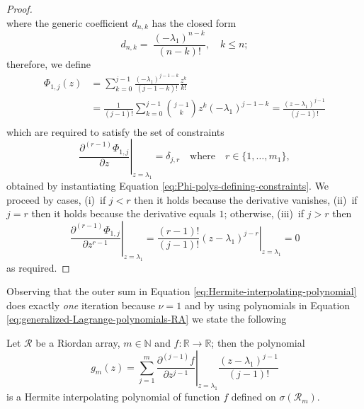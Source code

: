 \begin{proof}
\begin{equation}
\end{equation}
where the generic coefficient $d_{n,k}$ has the closed form
$$ d_{n,k} =~\frac{\left(-\lambda_{1}\right)^{n-k}}{\left(n-k\right)!},\quad k\leq n;$$ 
therefore, we define
\begin{displaymath}
\begin{split}
  \Phi_{1,j}(z) &= \sum_{k=0}^{j-1}{\frac{(-\lambda_{1})^{j-1-k}}{(j-1-k)!}\frac{z^{k}}{k!}}\\
                &= \frac{1}{(j-1)!}\sum_{k=0}^{j-1}{{ {j-1}\choose{k} }{z^{k}}{(-\lambda_{1})^{j-1-k}}}
                 = \frac{\left(z-\lambda_{1}\right)^{j-1}}{(j-1)!}\\
\end{split}
\end{displaymath}
which are required to satisfy the set of constraints 
\begin{displaymath}
 \left.  \frac{\partial^{(r-1)}{\Phi_{1,j}}}{\partial{z}} \right|_{z=\lambda_{1}} =
\delta_{j,r}\quad\text{where}\quad r \in \lbrace 1, \ldots, m_{1} \rbrace , 
\end{displaymath}
obtained by instantiating Equation \ref{eq:Phi-polys-defining-constraints}.  We
proceed by cases, (i)~if $j<r$ then it holds because the derivative vanishes,
(ii)~if $j=r$ then it holds because the derivative equals $1$; otherwise,
(iii)~if $j>r$ then
\begin{displaymath}
    \left. \frac{\partial^{(r-1)}{\Phi_{1,j}}}{\partial{z}^{r-1}}
    \right|_{z=\lambda_{1}} = 
    \left. \frac{(r-1)!}{(j-1)!}(z-\lambda_{1})^{j-r}
    \right|_{z=\lambda_{1}} = 0
\end{displaymath}
as required.
\qedhere
\end{proof}

Observing that the outer sum in Equation
\ref{eq:Hermite-interpolating-polynomial} does exactly \textit{one} iteration
because $\nu=1$ and by using polynomials in
Equation \ref{eq:generalized-Lagrange-polynomials-RA} %
we state the following
\begin{theorem}
\label{thm:Hermite-interpolating-polynomial-Riordan}
Let $\mathcal{R}$ be a Riordan array, $m\in\mathbb{N}$ and $f:
\mathbb{R}\rightarrow\mathbb{R}$; then the polynomial
\begin{equation}
\label{eq:Hermite-interpolating-polynomial-RA}
g_{m}(z) = {\sum_{j=1}^{m}{ \left.
\frac{\partial^{(j-1)}{f}}{\partial{z}^{j-1}} \right|_{z=\lambda_{1}}}}
\frac{\left(z-\lambda_{1}\right)^{j-1}}{(j-1)!}
\end{equation}
is a Hermite interpolating polynomial of function $f$ defined on
$\sigma\left(\mathcal{R}_{m}\right)$.
\end{theorem}


